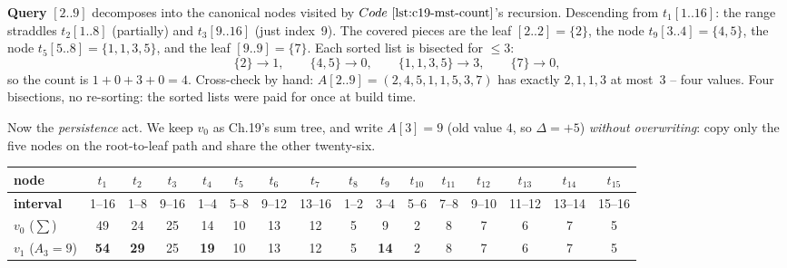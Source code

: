 \begin{tracebox}
\textbf{Query} \([2..9]\) decomposes into the canonical nodes visited by
\(\coderef{c19-mst-count}\)'s recursion.  Descending from \(t_1[1..16]\): the
range straddles \(t_2[1..8]\) (partially) and \(t_3[9..16]\) (just index~9).
The covered pieces are the leaf \([2..2]=\{2\}\), the node \(t_9[3..4]=\{4,5\}\),
the node \(t_5[5..8]=\{1,1,3,5\}\), and the leaf \([9..9]=\{7\}\).  Each sorted
list is bisected for \(\le 3\):
\[
  \{2\}\!\to 1,\qquad \{4,5\}\!\to 0,\qquad \{1,1,3,5\}\!\to 3,\qquad \{7\}\!\to 0,
\]
so the count is \(1+0+3+0=\boxed{4}\).  Cross-check by hand: \(A[2..9]=
(2,4,5,1,1,5,3,7)\) has exactly \(2,1,1,3\) at most~3 -- four values.  Four
bisections, no re-sorting: the sorted lists were paid for once at build time.
\end{tracebox}

Now the \emph{persistence} act.  We keep \(v_0\) as Ch.19's sum tree, and write
\(A[3]=9\) (old value \(4\), so \(\Delta=+5\)) \emph{without overwriting}: copy
only the five nodes on the root-to-leaf path and share the other twenty-six.

\begin{center}
\scriptsize
\renewcommand{\arraystretch}{1.1}
\setlength{\tabcolsep}{3pt}
\begin{tabular}{@{}l|ccccccccccccccc@{}}
\toprule
\textbf{node} & \(t_1\)&\(t_2\)&\(t_3\)&\(t_4\) & \(t_5\)&\(t_6\)&\(t_7\)&\(t_8\) & \(t_9\)&\(t_{10}\)&\(t_{11}\)&\(t_{12}\)&\(t_{13}\)&\(t_{14}\)&\(t_{15}\)\\
\midrule
\textbf{interval} & 1--16&1--8&9--16&1--4 & 5--8&9--12&13--16&1--2 & 3--4&5--6&7--8&9--10&11--12&13--14&15--16\\
\(v_0\) (\(\sum\)) & 49&24&25&14 & 10&13&12&5 & 9&2&8&7&6&7&5\\
\(v_1\) (\(A_3{=}9\)) & \textbf{54}&\textbf{29}&25&\textbf{19} & 10&13&12&5 & \textbf{14}&2&8&7&6&7&5\\
\bottomrule
\end{tabular}
\end{center}



